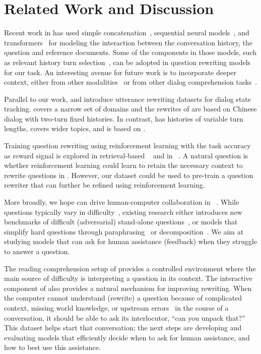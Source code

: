 \section{Related Work and Discussion}
\label{sec:related}







Recent work in  has used simple concatenation~\cite{elgohary2018Dataset}, sequential neural models~\cite{huang2018flowqa}, and transformers~\cite{qu2019Bert} for modeling the interaction between the conversation history, the question and reference documents.
Some of the components in those models, such as relevant history turn
selection~\cite{qu2019Attentive}, can be adopted in question rewriting models for our task.
An interesting avenue for future work is to incorporate deeper context, either from other modalities~\cite{das2017visual} or from other dialog comprehension tasks~\cite{sun2019dream}.

Parallel to our work,  and 
introduce utterance rewriting datasets for dialog state tracking.
 covers a narrow
set of domains and the rewrites of  are based on
Chinese dialog with two-turn fixed histories.
In contrast, \name{} has histories of variable turn lengths, covers wider topics, and is based on .


Training question rewriting using reinforcement learning with the task accuracy as reward signal is explored in retrieval-based ~\cite{liu2019generative}
and in ~\cite{buck2018ask}.
A natural question is whether reinforcement learning could learn to retain the necessary context to rewrite questions in .
However, our dataset could be used to pre-train a question rewriter that  can further be refined using reinforcement learning.

More broadly, we hope \name{} can drive human-computer collaboration in ~\cite{feng2019What}.
While questions typically vary in difficulty~\cite{sugawara2018makes}, existing research either introduces new benchmarks of difficult
(adversarial) stand-alone questions~\cite[inter alia]{dua2019DROP,wallace2019Trick}, 
or models that 
simplify hard questions through paraphrasing~\cite{dong2017Learning}
or decomposition~\cite{talmor2018web}.
We aim at studying  models that can ask for human assistance (feedback) when they struggle to answer a question.

The reading comprehension setup of  provides a controlled environment where the main source of difficulty is  interpreting a question in its context.
The interactive component of  also provides a natural mechanism for improving rewriting.
When the computer cannot understand (rewrite) a question because of complicated context, missing world knowledge, or upstream errors~\cite{Peskov-19} in the course of a conversation, it should be able to ask its interlocutor, ``can you unpack that?''
This dataset helps start that conversation; the next steps are developing and evaluating models that efficiently
decide when to ask for human assistance, and how to best use this assistance.


